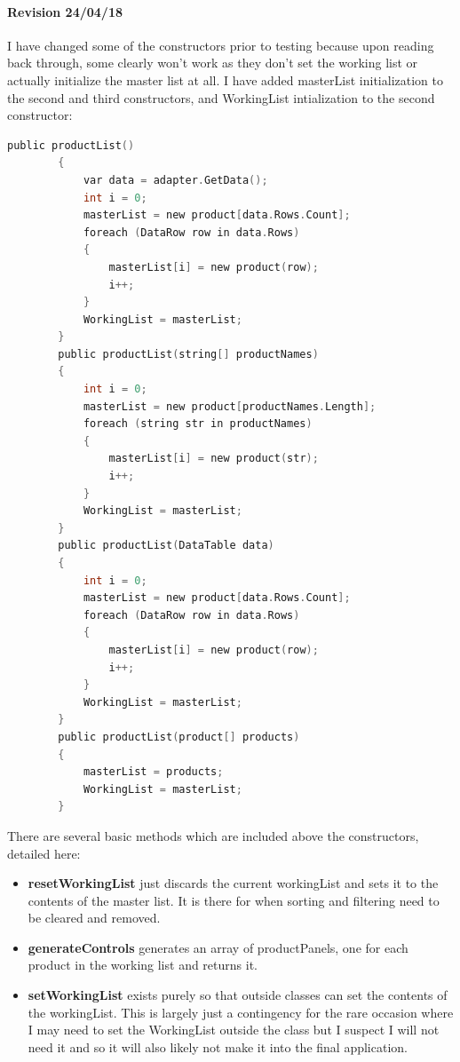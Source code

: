 ﻿\documentclass{article}
\begin{document}
    \paragraph{Revision 24/04/18}
    I have changed some of the constructors prior to testing because upon reading back through, some clearly won't work as they don't set the working list or actually initialize the master list at all.
    I have added masterList initialization to the second and third constructors, and WorkingList intialization to the second constructor:
    \begin{lstlisting}[language=C]
        public productList()
		{
			var data = adapter.GetData();
			int i = 0;
			masterList = new product[data.Rows.Count];
			foreach (DataRow row in data.Rows)
			{
				masterList[i] = new product(row);
				i++;
			}
			WorkingList = masterList;
		}
		public productList(string[] productNames)
		{
			int i = 0;
			masterList = new product[productNames.Length];
			foreach (string str in productNames)
			{
				masterList[i] = new product(str);
				i++;
			}
			WorkingList = masterList;
		}
		public productList(DataTable data)
		{
			int i = 0;
			masterList = new product[data.Rows.Count];
			foreach (DataRow row in data.Rows)
			{
				masterList[i] = new product(row);
				i++;
			}
			WorkingList = masterList;
		}
		public productList(product[] products)
		{
			masterList = products;
			WorkingList = masterList;
		}
    \end{lstlisting}
    There are several basic methods which are included above the constructors, detailed here:
    \begin{itemize}
        \item \textbf{resetWorkingList} just discards the current workingList and sets it to the contents of the master list.
        It is there for when sorting and filtering need to be cleared and removed.
        \item \textbf{generateControls} generates an array of productPanels, one for each product in the working list and returns it.
        \item \textbf{setWorkingList} exists purely so that outside classes can set the contents of the workingList.
        This is largely just a contingency for the rare occasion where I may need to set the WorkingList outside the class but I suspect I will not need it and so it will also likely not make it into the final application.
    \end{itemize}
    \newpage
\end{document}
